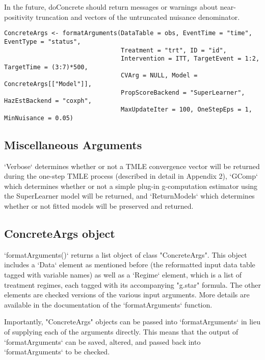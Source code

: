 \documentclass{report}
\newcommand{\1}{\ensuremath{\mathbf{1}}}
\begin{document}
In the future, doConcrete should return messages or warnings about near-positivity truncation and vectors of the untruncated nuisance denominator.

\begin{lstlisting}
ConcreteArgs <- formatArguments(DataTable = obs, EventTime = "time", EventType = "status", 
                                Treatment = "trt", ID = "id", 
                                Intervention = ITT, TargetEvent = 1:2, TargetTime = (3:7)*500, 
                                CVArg = NULL, Model = ConcreteArgs[["Model"]], 
                                PropScoreBackend = "SuperLearner", HazEstBackend = "coxph", 
                                MaxUpdateIter = 100, OneStepEps = 1, MinNuisance = 0.05)
\end{lstlisting}

\subsection{Miscellaneous Arguments}
`Verbose` determines whether or not a TMLE convergence vector will be returned during the one-step TMLE process (described in detail in Appendix 2), `GComp` which determines whether or not a simple plug-in g-computation estimator using the SuperLearner model will be returned, and `ReturnModels` which determines whether or not fitted models will be preserved and returned.

\subsection{ConcreteArgs object}
`formatArguments()` returns a list object of class "ConcreteArgs". This object includes a `Data` element as mentioned before (the reformatted input data table tagged with variable names) as well as a `Regime` element, which is a list of treatment regimes, each tagged with its accompanying "g.star" formula. The other elements are checked versions of the various input arguments. More details are available in the documentation of the `formatArguments` function.

Importantly, "ConcreteArgs" objects can be passed into `formatArguments` in lieu of supplying each of the arguments directly. This means that the output of `formatArguments` can be saved, altered, and passed back into `formatArguments` to be checked.
\end{document}
